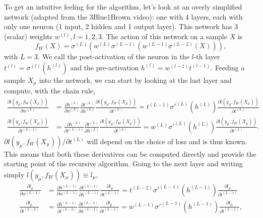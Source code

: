 \documentclass{article}
\begin{document}
To get an intuitive feeling for the algorithm, let's look at an overly simplified network (adapted from the 3Blue1Brown video): one with 4 layers, each with only one neuron (1 input, 2 hidden and 1 output layer). This network has 3 (scalar) weights $w^{(l)}, l=1,2,3$. The action of this network on a sample $X$ is
\begin{equation}
    f_W(X)
    =
    \sigma^{(L)}\left(
        w^{(L)}\sigma^{(L-1)}\left(
            w^{(L-1)}\sigma^{(L-2)}\left(
                X
            \right)
        \right)
    \right),
\end{equation}
with $L=3$. We call the post-activation of the neuron in the $l$-th layer $t^{(l)} = \sigma^{(l)}(h^{(l)})$ and the pre-activation $h^{(l)} = w^{(l-1)} t^{(l-1)}$.
Feeding a sample $X_{\mu}$ into the network, we can start by looking at the last layer and compute, with the chain rule,
\begin{align}
    \frac{\partial l(y_{\mu}, f_W(X_{\mu}))}{\partial w^{(L)}}
    &=
    \frac{\partial h^{(L)}}{\partial w^{(L)}}
    \frac{\partial t^{(L)}}{\partial h^{(L)}}
    \frac{\partial l(y_{\mu}, f_W(X_{\mu}))}{\partial t^{(L)}}
    =
    t^{(L-1)} \sigma'^{(L)} (h^{(L)})
    \frac{\partial l(y_{\mu}, f_W(X_{\mu}))}{\partial t^{(L)}}
    \\
    \frac{\partial l(y_{\mu}, f_W(X_{\mu}))}{\partial t^{(L-1)}}
    &=
    \frac{\partial h^{(L)}}{\partial t^{(L-1)}}
    \frac{\partial t^{(L)}}{\partial h^{(L)}}
    \frac{\partial l(y_{\mu}, f_W(X_{\mu}))}{\partial t^{(L)}}
    =
    w^{(L)} \sigma'^{(L)} (h^{(L)})
    \frac{\partial l(y_{\mu}, f_W(X_{\mu}))}{\partial t^{(L)}}.
\end{align}
$\partial l(y_{\mu}, f_W(X_{\mu})) / \partial t^{(L)}$ will depend on the choice of loss and is thus known. This means that both these derivatives can be computed directly and provide the starting point of the recursive algorithm. Going to the next layer and writing simply $l(y_{\mu}, f_W(X_{\mu})) \equiv l_{\mu}$,
\begin{align}
    \frac{\partial l_{\mu}}{\partial w^{(L-1)}}
    &=
    \frac{\partial h^{(L-1)}}{\partial w^{(L-1)}}
    \frac{\partial t^{(L-1)}}{\partial h^{(L-1)}}
    \frac{\partial l_{\mu}}{\partial t^{(L-1)}}
    =
    t^{(L-2)}\sigma'^{(L-1)}(h^{(L-1)})
    \frac{\partial l_{\mu}}{\partial t^{(L-1)}} \\
    \frac{\partial l_{\mu}}{\partial t^{(L-2)}}
    &=
    \frac{\partial h^{(L-1)}}{\partial t^{(L-2)}}
    \frac{\partial t^{(L-1)}}{\partial h^{(L-1)}}
    \frac{\partial l_{\mu}}{\partial t^{(L-1)}}
    =
    w^{(L-1)}\sigma'^{(L-1)}(h^{(L-1)})
    \frac{\partial l_{\mu}}{\partial t^{(L-1)}},
\end{align}
\end{document}
